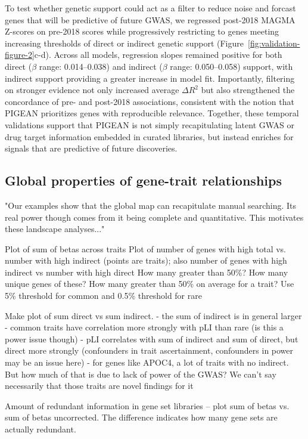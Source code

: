 \documentclass[sn-nature,lineno]{sn-jnl}%
\theoremstyle{thmstyleone}%
\theoremstyle{thmstyletwo}%
\theoremstyle{thmstylethree}%
\begin{document}
To test whether genetic support could act as a filter to reduce noise and forcast genes that will be predictive of future GWAS, we regressed post-2018 MAGMA Z-scores on pre-2018 scores while progressively restricting to genes meeting increasing thresholds of direct or indirect genetic support (Figure~\ref{fig:validation-figure-2}c-d). Across all models, regression slopes remained positive for both direct ($\beta$ range: 0.014–0.038) and indirect ($\beta$ range: 0.050–0.058) support, with indirect support providing a greater increase in model fit. Importantly, filtering on stronger evidence not only increased average $\Delta R^2$ but also strengthened the concordance of pre- and post-2018 associations, consistent with the notion that PIGEAN prioritizes genes with reproducible relevance. Together, these temporal validations support that PIGEAN is not simply recapitulating latent GWAS or drug target information embedded in curated libraries, but instead enriches for signals that are predictive of future discoveries.  

\subsection{Global properties of gene-trait relationships}

"Our examples show that the global map can recapitulate manual searching. Its real power though comes from it being complete and quantitative. This motivates these landscape analyses..."

Plot of sum of betas across traits
Plot of number of genes with high total vs. number with high indirect (points are traits); also number of genes with high indirect vs number with high direct
How many greater than 50\%? How many unique genes of these?
How many greater than 50\% on average for a trait? Use 5\% threshold for common and 0.5\% threshold for rare

Make plot of sum direct vs sum indirect.
 - the sum of indirect is in general larger
 - common traits have correlation more strongly with pLI than rare (is this a power issue though)
 - pLI correlates with sum of indirect and sum of direct, but direct more strongly (confounders in trait ascertainment, confounders in power may be an issue here)
  - for genes like APOC4, a lot of traits with no indirect. But how much of that is due to lack of power of the GWAS? We can't say necessarily that those traits are novel findings for it


Amount of redundant information in gene set libraries -- plot sum of betas vs. sum of betas uncorrected. The difference indicates how many gene sets are actually redundant.
\end{document}
